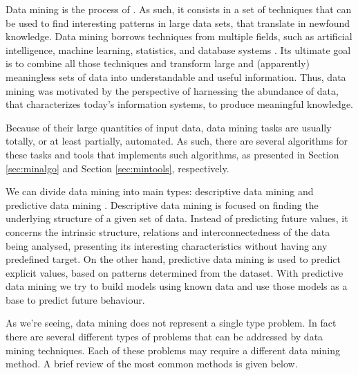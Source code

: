Data mining is the process of  \cite[p. 5]{han2006data}. As such, it consists in a
set of techniques that can be used to find interesting patterns in large data
sets, that translate in newfound knowledge. Data mining borrows techniques from
multiple fields, such as artificial intelligence, machine learning, statistics,
and database systems \cite{Chakrabarti2012}. Its ultimate goal is to combine all
those techniques and transform large and (apparently) meaningless sets of data
into understandable and useful information. Thus, data mining was motivated by
the perspective of harnessing the abundance of data, that characterizes today's
information systems, to produce meaningful knowledge.

Because of their large quantities of input data, data mining tasks are usually
totally, or at least partially, automated. As such, there are several algorithms
for these tasks and tools that implements such algorithms, as presented in
Section \ref{sec:minalgo} and Section \ref{sec:mintools}, respectively.

We can divide data mining into main types: descriptive data mining and
predictive data mining \cite{Fayyad1996}. Descriptive data mining is focused on
finding the underlying structure of a given set of data. Instead of predicting
future values, it concerns the intrinsic structure, relations and
interconnectedness of the data being analysed, presenting its interesting
characteristics without having any predefined target. On the other hand,
predictive data mining is used to predict explicit values, based on patterns
determined from the dataset. With predictive data mining we try to build models
using known data and use those models as a base to predict future behaviour.

As we're seeing, data mining does not represent a single type problem. In fact
there are several different types of problems that can be addressed by data
mining techniques. Each of these problems may require a different data mining
method. A brief review of the most common methods is given below.

